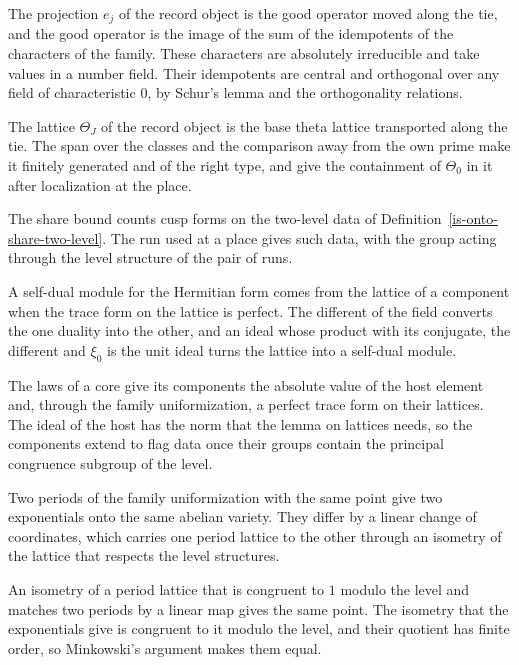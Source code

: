The projection $e_j$ of the record object is the good operator moved along the tie, and the good
operator is the image of the sum of the idempotents of the characters of the family. These characters
are absolutely irreducible and take values in a number field. Their idempotents are central and
orthogonal over any field of characteristic $0$, by Schur's lemma and the orthogonality relations.

The lattice $\Theta_J$ of the record object is the base theta lattice transported along the tie. The
span over the classes and the comparison away from the own prime make it finitely generated and of
the right type, and give the containment of $\Theta_0$ in it after localization at the place.

The share bound counts cusp forms on the two-level data of
Definition~\ref{is-onto-share-two-level}. The run used at a place gives such data, with the group
acting through the level structure of the pair of runs.

A self-dual module for the Hermitian form comes from the lattice of a component when the trace form on the
lattice is perfect. The different of the field converts the one duality into the other, and an ideal
whose product with its conjugate, the different and $\xi_0$ is the unit ideal turns the lattice into a
self-dual module.

The laws of a core give its components the absolute value of the host element and, through the family
uniformization, a perfect trace form on their lattices. The ideal of the host has the norm that the lemma on
lattices needs, so the components extend to flag data once their groups contain the principal congruence
subgroup of the level.

Two periods of the family uniformization with the same point give two exponentials onto the same abelian
variety. They differ by a linear change of coordinates, which carries one period lattice to the other
through an isometry of the lattice that respects the level structures.

An isometry of a period lattice that is congruent to $1$ modulo the level and matches two periods by a
linear map gives the same point. The isometry that the exponentials give is congruent to it modulo the
level, and their quotient has finite order, so Minkowski's argument makes them equal.

